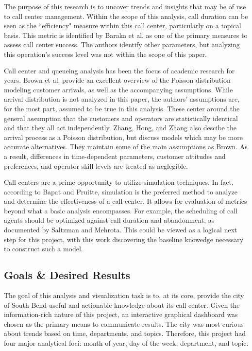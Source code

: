 \documentclass{article}
\begin{document}
The purpose of this research is to uncover trends and insights that may be of use to call center management.  Within the scope of this analysis, call duration can be seen as the ``efficiency" measure within this call center, particularly on a topical basis.  This metric is identified by Baraka et al. as one of the primary measures to assess call center success.\cite{baraka}  The authors identify other parameters, but analyzing this operation's success level was not within the scope of this paper.
\par
Call center and queueing analysis has been the focus of academic research for years.  Brown et al. provide an excellent overview of the Poisson distribution modeling customer arrivals, as well as the accompanying assumptions.  While arrival distribution is not analyzed in this paper, the authors' assumptions are, for the most part, assumed to be true in this analysis.  These center around the general assumption that the customers and operators are statistically identical and that they all act independently.\cite{brown}  Zhang, Hong, and Zhang also descibe the arrival process as a Poisson distribution, but discuss models which may be more accurate alternatives.\cite{zhang}  They maintain some of the main assumptions as Brown.  As a result, differences in time-dependent parameters, customer attitudes and preferences, and operator skill levels are treated as neglegible.
\par
Call centers are a prime opportunity to utilize simulation techniques.  In fact, according to Bapat and Pruitte, simulation is the preferred method to analyze and determine the effectiveness of a call center.\cite{bapat}  It allows for evaluation of metrics beyond what a basic analysis encompasses.  For example, the scheduling of call agents should be optimized against call duration and abandonment, as documented by Saltzman and Mehrota.\cite{saltzman}  This could be viewed as a logical next step for this project, with this work discovering the baseline knowedge necessary to construct such a model.




	\subsection{Goals \& Desired Results}

The goal of this analysis and visualization task is to, at its core, provide the city of South Bend useful and actionable knowledge about its call center.  Given the information-rich nature of this project, an interactive graphical dashboard was chosen as the primary means to communicate results.  The city was most curious about trends based on time, departments, and topics.  Therefore, this project had four major analytical foci:  month of year, day of the week, department, and topic.
\end{document}
